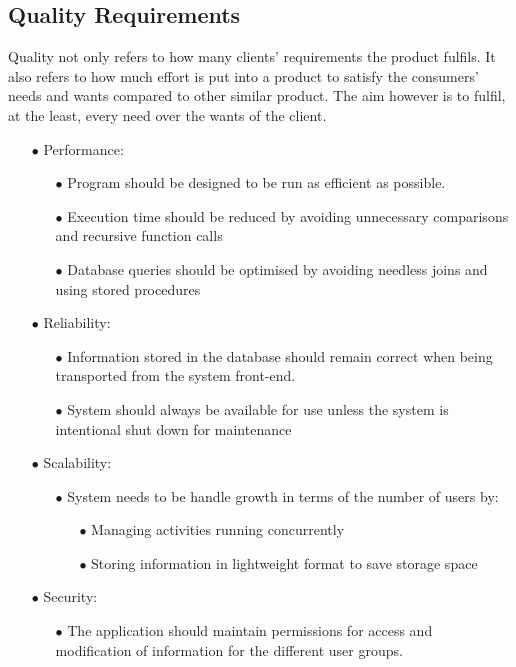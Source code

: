 \documentclass[a4paper,12pt]{article}
\begin{document}
\subsection{Quality Requirements}
Quality not only refers to how many clients’ requirements the product fulfils. It also refers to how much effort is put into a product to satisfy the consumers’ needs and wants compared to other similar product. The aim however is to fulfil, at the least, every need over the wants of the client.
 \begin{itemize}
 	\item[$\bullet$]Performance: 
	 \begin{itemize}
		 \item[$\bullet$]Program should be designed to be run as efficient as possible.
		 \item[$\bullet$]Execution time should be reduced by avoiding unnecessary comparisons and recursive function calls
		 \item[$\bullet$]Database queries should be optimised by avoiding needless joins and using stored procedures
	 \end{itemize}
 	\item[$\bullet$]Reliability:  
	 \begin{itemize}
	 	\item[$\bullet$]Information stored in the database should remain correct when being transported from the system front-end.
	 	\item[$\bullet$]System should always be available for use unless the system is intentional shut down  for maintenance
	 \end{itemize}
 	\item[$\bullet$]Scalability: 
 	 \begin{itemize}
 	 		\item[$\bullet$]System needs to be handle growth in terms of the number of users by: 
 		\begin{itemize}
 			\item[$\bullet$]Managing activities running concurrently
	 		\item[$\bullet$]Storing information in lightweight format to save storage space
		 \end{itemize}
	 \end{itemize}
 	\item[$\bullet$]Security:
 	\begin{itemize}
 		\item[$\bullet$]The application should maintain permissions for access and modification of information for the different user groups.

\end{itemize}
\end{itemize}
\end{document}
